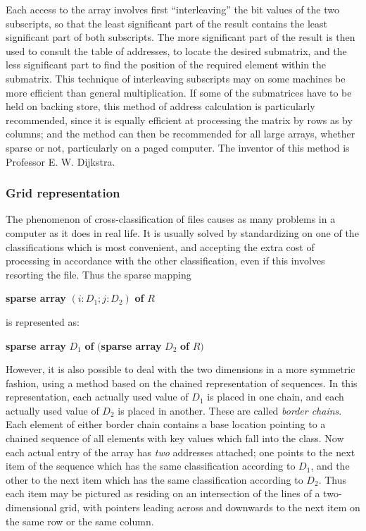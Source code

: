\documentclass[twoside,11pt]{book}
\begin{document}
Each access to the array involves first ``interleaving'' the bit values of the two subscripts, so that the least significant part of the result contains the least significant part of both subscripts. The more significant part of the result is then used to consult the table of addresses, to locate the desired submatrix, and the less significant part to find the position of the required element within the submatrix. This technique of interleaving subscripts may on some machines be more efficient than general multiplication. If some of the submatrices have to be held on backing store, this method of address calculation is particularly recommended, since it is equally efficient at processing the matrix by rows as by columns; and the method can then be recommended for all large arrays, whether sparse or not, particularly on a paged computer. The inventor of this method is Professor E. W. Dijkstra.

\subsubsection{Grid representation}

The phenomenon of cross-classification of files causes as many problems in a computer as it does in real life. It is usually solved by standardizing on one of the classifications which is most convenient, and accepting the extra cost of processing in accordance with the other classification, even if this involves resorting the file. Thus the sparse mapping

\quad \textbf{sparse array} $(i:D_1; j:D_2)$ \textbf{of} $R$

\noindent
is represented as:

\quad \textbf{sparse array} $D_1$ \textbf{of} $($\textbf{sparse array} $D_2$ \textbf{of} $R)$

However, it is also possible to deal with the two dimensions in a more symmetric fashion, using a method based on the chained representation of sequences. In this representation, each actually used value of $D_1$ is placed in one chain, and each actually used value of $D_2$ is placed in another. These are called \textit{border chains}. Each element of either border chain contains a base location pointing to a chained sequence of all elements with key values which fall into the class. Now each actual entry of the array has \textit{two} addresses attached; one points to the next item of the sequence which has the same classification according to $D_1$, and the other to the next item which has the same classification according to $D_2$. Thus each item may be pictured as residing on an intersection of the lines of a two-dimensional grid, with pointers leading across and downwards to the next item on the same row or the same column.
\end{document}
